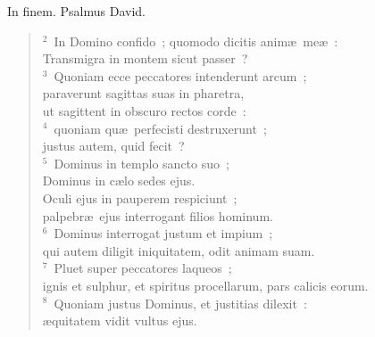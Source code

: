 \bchapter
\lettrine[lines=3,image=true,loversize=0.05,lraise=-0.03]{I}{}n finem. Psalmus David.
\begin{flushleft}\begin{verse}\vspace{6pt}${}^{2}$~In Domino confido~; quomodo dicitis anim\ae\ me\ae~:\\ Transmigra in montem sicut passer~?\\
${}^{3}$~Quoniam ecce peccatores intenderunt arcum~;\\ paraverunt sagittas suas in pharetra,\\ ut sagittent in obscuro rectos corde~:\\
${}^{4}$~quoniam qu\ae\ perfecisti destruxerunt~;\\ justus autem, quid fecit~?\\
${}^{5}$~Dominus in templo sancto suo~;\\ Dominus in c\ae lo sedes ejus.\\ Oculi ejus in pauperem respiciunt~;\\ palpebr\ae\ ejus interrogant filios hominum.\\
${}^{6}$~Dominus interrogat justum et impium~;\\ qui autem diligit iniquitatem, odit animam suam.\\
${}^{7}$~Pluet super peccatores laqueos~;\\ ignis et sulphur, et spiritus procellarum, pars calicis eorum.\\
${}^{8}$~Quoniam justus Dominus, et justitias dilexit~:\\ \ae quitatem vidit vultus ejus.\end{verse}\end{flushleft}



